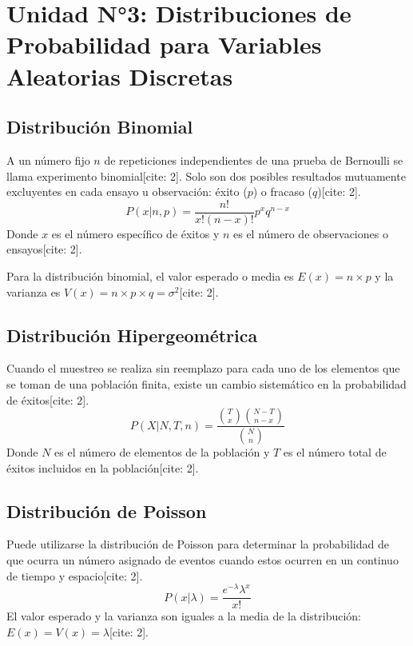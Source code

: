 \documentclass[12pt,a4paper]{book}
\begin{document}
\chapter{Unidad N°3: Distribuciones de Probabilidad para Variables Aleatorias Discretas}

\section{Distribución Binomial}
A un número fijo $n$ de repeticiones independientes de una prueba de Bernoulli se llama experimento binomial[cite: 2]. Solo son dos posibles resultados mutuamente excluyentes en cada ensayo u observación: éxito ($p$) o fracaso ($q$)[cite: 2].
\[
P(x|n,p) = \frac{n!}{x!(n-x)!} p^x q^{n-x}
\]
Donde $x$ es el número específico de éxitos y $n$ es el número de observaciones o ensayos[cite: 2].

\begin{ejemplo}
Para la distribución binomial, el valor esperado o media es $E(x) = n \times p$ y la varianza es $V(x) = n \times p \times q = \sigma^{2}$[cite: 2].
\end{ejemplo}

\section{Distribución Hipergeométrica}
Cuando el muestreo se realiza sin reemplazo para cada uno de los elementos que se toman de una población finita, existe un cambio sistemático en la probabilidad de éxitos[cite: 2].
\[
P(X|N,T,n) = \frac{ \binom{T}{x} \binom{N-T}{n-x} }{ \binom{N}{n} }
\]
Donde $N$ es el número de elementos de la población y $T$ es el número total de éxitos incluidos en la población[cite: 2].

\section{Distribución de Poisson}
Puede utilizarse la distribución de Poisson para determinar la probabilidad de que ocurra un número asignado de eventos cuando estos ocurren en un continuo de tiempo y espacio[cite: 2].
\[
P(x|\lambda) = \frac{e^{-\lambda} \lambda^x}{x!}
\]
El valor esperado y la varianza son iguales a la media de la distribución: $E(x) = V(x) = \lambda$[cite: 2].
\end{document}
